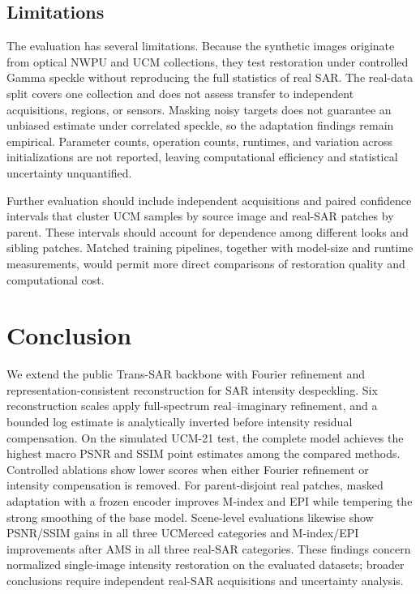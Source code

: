 \documentclass[conference]{IEEEtran}
\begin{document}
\subsection{Limitations}
The evaluation has several limitations. Because the synthetic images originate from optical NWPU and UCM collections, they test restoration under controlled Gamma speckle without reproducing the full statistics of real SAR. The real-data split covers one collection and does not assess transfer to independent acquisitions, regions, or sensors. Masking noisy targets does not guarantee an unbiased estimate under correlated speckle, so the adaptation findings remain empirical. Parameter counts, operation counts, runtimes, and variation across initializations are not reported, leaving computational efficiency and statistical uncertainty unquantified.

Further evaluation should include independent acquisitions and paired confidence intervals that cluster UCM samples by source image and real-SAR patches by parent. These intervals should account for dependence among different looks and sibling patches. Matched training pipelines, together with model-size and runtime measurements, would permit more direct comparisons of restoration quality and computational cost.

\section{Conclusion}
We extend the public Trans-SAR backbone with Fourier refinement and representation-consistent reconstruction for SAR intensity despeckling. Six reconstruction scales apply full-spectrum real--imaginary refinement, and a bounded log estimate is analytically inverted before intensity residual compensation. On the simulated UCM-21 test, the complete model achieves the highest macro PSNR and SSIM point estimates among the compared methods. Controlled ablations show lower scores when either Fourier refinement or intensity compensation is removed. For parent-disjoint real patches, masked adaptation with a frozen encoder improves M-index and EPI while tempering the strong smoothing of the base model. Scene-level evaluations likewise show PSNR/SSIM gains in all three UCMerced categories and M-index/EPI improvements after AMS in all three real-SAR categories. These findings concern normalized single-image intensity restoration on the evaluated datasets; broader conclusions require independent real-SAR acquisitions and uncertainty analysis.
\end{document}
